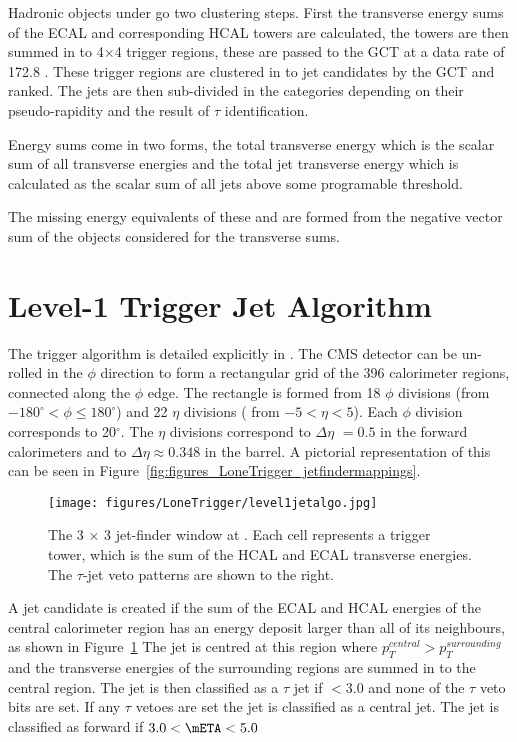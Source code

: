 Hadronic objects under go two clustering steps. First the transverse energy 
sums of the ECAL and corresponding HCAL towers are
calculated, the towers are then summed in to 4$\times$4 trigger regions, these 
are passed to the GCT at a data rate of 172.8 \Gbs.
These trigger regions are clustered in to jet candidates by the GCT and ranked. 
The jets are then sub-divided in the 
categories depending on their pseudo-rapidity and the result of $\tau$ 
identification. 

Energy sums come in two forms, the total transverse energy \ET which is the 
scalar sum of all transverse energies and the total jet transverse energy \HT 
which is calculated as the scalar sum of all jets above some programable 
threshold.

The missing energy equivalents of these \MET and \MHT are formed from the 
negative vector sum of the objects considered for the
transverse sums.



\section{Level-1 Trigger Jet Algorithm} %
\label{sec:leve_1_trigger_jet_algorithm}
The \Lone trigger algorithm is detailed explicitly in \cite{gctcomm}.
The CMS detector can be un-rolled in the $\phi$ direction to form a rectangular 
grid of the 396 calorimeter regions, connected along the $\phi$ edge. The
rectangle is formed from 18 $\phi$ divisions (from $-180^{\circ} < \phi \leq 180^{\circ}$) and 22 $\eta$ divisions ( from $-5 < \eta < 5$). Each $\phi$ division corresponds to 20$^{\circ}$. The $\eta$ divisions correspond to $\Delta\eta$ $= 0.5$ in the forward calorimeters and to $\Delta\eta \approx 0.348$ in the barrel. A pictorial representation of this can be seen in 
Figure~\ref{fig:figures_LoneTrigger_jetfindermappings}.

\begin{figure}[ht]
  \centering
    \texttt{[image: figures/LoneTrigger/level1jetalgo.jpg]}
  \caption{The 3 $\times$ 3 jet-finder window at \Lone. Each cell represents a 
  trigger tower, which is the sum of the HCAL and ECAL transverse energies. The 
  $\tau$-jet veto patterns are shown to the right.}
  \label{fig:figures_LoneTrigger_level1jetalgo}
\end{figure}


A jet candidate is created if the sum of the ECAL and HCAL energies of the 
central calorimeter region has an energy deposit larger than all of its 
neighbours, as shown in Figure~\ref{fig:figures_LoneTrigger_level1jetalgo}
The jet is centred at this region where $p_{T}^{central} > p_{T}^{surrounding}$
and the transverse energies of the surrounding regions are summed in to the 
central region. The jet is then classified as a $\tau$ jet if \mETA $< 3.0$ and 
none of the $\tau$ veto bits are set. If any $\tau$ vetoes are set the jet is 
classified as a central jet. The jet is classified as forward if $ 3.0 < \mETA 
< 5.0$

